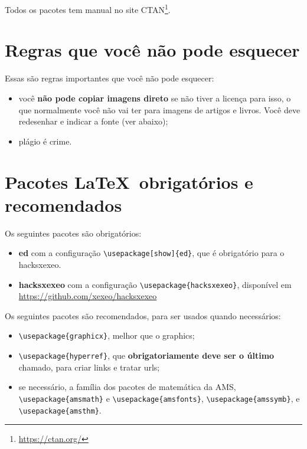 \documentclass{article}
\begin{document}
Todos os pacotes tem manual no site CTAN\footnote{\url{https://ctan.org/}}.

\section{Regras que você não pode esquecer}

Essas são regras importantes que você não pode esquecer:

\begin{itemize}
    \item você \textbf{não pode copiar imagens direto} se não tiver a licença para isso, o que normalmente você não vai ter para imagens de artigos e livros. Você deve redesenhar e indicar a fonte (ver abaixo);
    \item plágio é crime.
\end{itemize}



\section{Pacotes \LaTeX\  obrigatórios e recomendados}

Os seguintes pacotes são obrigatórios:

\begin{itemize}
    \item \textbf{ed} com a configuração \verb!\usepackage[show]{ed}!, que é obrigatório para o hacksxexeo.
        \item \textbf{hacksxexeo} com a configuração \verb!\usepackage{hacksxexeo}!, disponível em \url{https://github.com/xexeo/hacksxexeo}
\end{itemize}
    
Os seguintes pacotes são recomendados, para ser usados quando necessários:    
        
\begin{itemize}
    \item \verb!\usepackage{graphicx}!, melhor que o graphics;
    \item \verb!\usepackage{hyperref}!, que \textbf{obrigatoriamente deve ser o último} chamado, para criar links e tratar urls;
    \item se necessário, a família dos pacotes de matemática da AMS, \verb!\usepackage{amsmath}! e
    \verb!\usepackage{amsfonts}!, \verb!\usepackage{amssymb}!, e \verb!\usepackage{amsthm}!.
\end{itemize}
\end{document}

